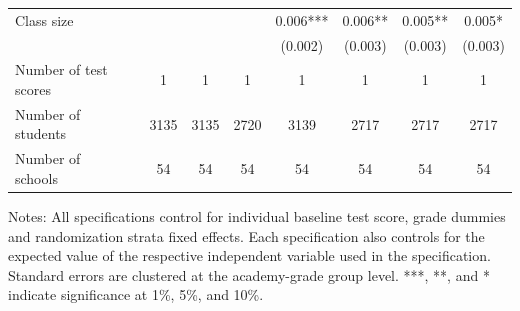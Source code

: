 \begin{center}
\begin{scriptsize}
\begin{threeparttable}
\begin{tabular} {@{} l l c c c c c c c  @{}}
Class size &  &  &  &  & 0.006*** & 0.006** & 0.005** & 0.005* \\
                 &  &  &  &  & (0.002) & (0.003) & (0.003) & (0.003) \\
\midrule
Number of test scores &  & 1 & 1 & 1 & 1 & 1 & 1 & 1 \\
Number of students &  & 3135 & 3135 & 2720 & 3139 & 2717 & 2717 & 2717 \\
Number of schools &  & 54 & 54 & 54 & 54 & 54 & 54 & 54 \\
\bottomrule
\end{tabular}
\begin{tablenotes}
\item Notes: All specifications control for individual baseline test score, grade dummies and randomization strata fixed effects. Each specification also controls for the expected value of the respective independent variable used in the specification. Standard errors are clustered at the academy-grade group level. ***, **, and * indicate significance at 1\%, 5\%, and 10\%.\end{tablenotes}
\end{threeparttable}
\end{scriptsize}
\end{center}
\clearpage
